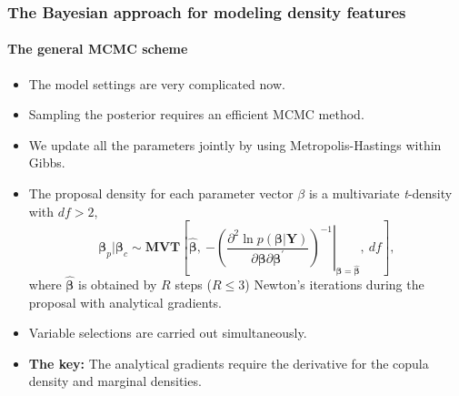 \documentclass[10pt]{beamer}
\begin{document}
\begin{frame}
  \frametitle{The Bayesian approach for modeling density features}
  \framesubtitle{The general MCMC scheme}

  \begin{itemize}

  \item The model settings are very complicated now.

  \item Sampling the posterior requires an efficient MCMC method.

  \item We update all the parameters jointly by using
    Metropolis-Hastings within Gibbs.
  \item The proposal density for each parameter vector $\beta$ is a multivariate \emph{t}-density with  $df>2$,
    \[
    \bm{\beta}_{p} |\bm{\beta}_{c}\sim\bm{MVT}\left[\bm{\hat{\beta}},~\left.-\left(\frac{\partial^{2}\ln
            p(\bm{\beta}|\bm{Y})}{\partial\bm{\beta}\partial\bm{\beta}^{\prime}}\right)^{-1}\right\vert
      _{\bm{\beta}=\bm{\hat{\beta}}},~df\right],
    \]
    where $\bm{\hat{\beta}}$ is obtained by $R$ steps ($R\leq 3$) Newton's
    iterations during the proposal with analytical gradients.

  \item Variable selections are carried out simultaneously.

  \item \textbf{The key:} The analytical gradients require the derivative for
    the copula density and marginal densities.


  \end{itemize}

\end{frame}
\end{document}

